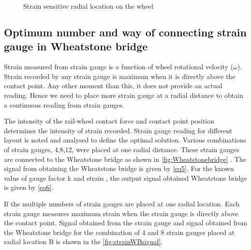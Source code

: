 \documentclass[]{interact}
\theoremstyle{plain}%
\theoremstyle{definition}
\theoremstyle{remark}
\begin{document}
\begin{figure}[h]
\centering
{}
\caption{ Strain sensitive radial location on the wheel} \label{fig:Radiallocation}
\end{figure}

\subsection{Optimum number and way of connecting strain gauge in Wheatstone bridge}
Strain measured from strain gauge is a function of wheel rotational velocity ($\omega$). Strain recorded by any strain gauge is maximum when it is directly above the contact point. Any other moment than this, it does not provide an actual reading. Hence we need to place more strain gauge at a radial distance to obtain a continuous reading from strain gauges.

The intensity of the rail-wheel contact force and contact point position determines the intensity of strain recorded. Strain gauge reading for different layout is noted and analysed to define the optimal solution. Various combinations of strain gauges, 4,8,12, were placed at one radial distance. These strain gauges are connected to the Wheatstone bridge as shown in \cref{fig:Wheatstonebridge} . The signal from obtaining the Wheatstone bridge is given by \cref{eq5}. For the known value of gauge factor k and strain , the output signal obtained Wheatstone bridge is given by \cref{eq6}. 

If the multiple numbers of strain gauges are placed at one radial location. Each strain gauge measures maximum strain when the strain gauge is directly above the contact point.   Signal obtained from the strain gauge and signal obtained from the Wheatstone bridge for the combination of 4 and 8 strain gauges placed at radial location B is shown in the \cref{fig:strainWBsignal}. 
\end{document}
